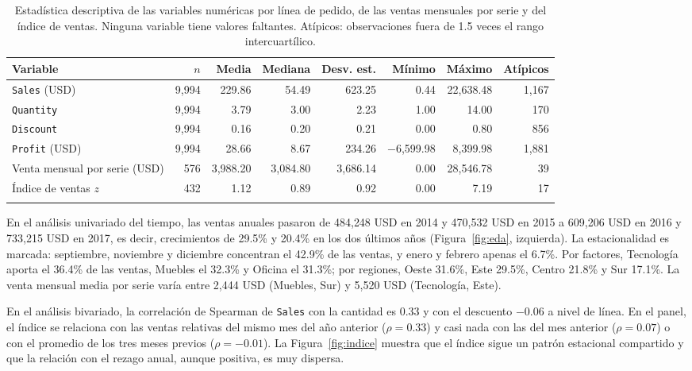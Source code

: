 \documentclass[pdflatex,sn-mathphys-num]{sn-jnl}
\theoremstyle{thmstyleone}
\begin{document}
\begin{table}[!htb]
\caption{Estadística descriptiva de las variables numéricas por línea de pedido, de las ventas mensuales por serie y del índice de ventas. Ninguna variable tiene valores faltantes. Atípicos: observaciones fuera de 1.5 veces el rango intercuartílico.}\label{tab:eda}
\footnotesize
\begin{tabular*}{\textwidth}{@{\extracolsep\fill}lrrrrrrr}
\toprule
Variable & $n$ & Media & Mediana & Desv. est. & Mínimo & Máximo & Atípicos \\
\midrule
\texttt{Sales} (USD) & 9{,}994 & 229.86 & 54.49 & 623.25 & 0.44 & 22{,}638.48 & 1{,}167 \\
\texttt{Quantity} & 9{,}994 & 3.79 & 3.00 & 2.23 & 1.00 & 14.00 & 170 \\
\texttt{Discount} & 9{,}994 & 0.16 & 0.20 & 0.21 & 0.00 & 0.80 & 856 \\
\texttt{Profit} (USD) & 9{,}994 & 28.66 & 8.67 & 234.26 & $-$6{,}599.98 & 8{,}399.98 & 1{,}881 \\
Venta mensual por serie (USD) & 576 & 3{,}988.20 & 3{,}084.80 & 3{,}686.14 & 0.00 & 28{,}546.78 & 39 \\
Índice de ventas $z$ & 432 & 1.12 & 0.89 & 0.92 & 0.00 & 7.19 & 17 \\
\botrule
\end{tabular*}
\end{table}

En el análisis univariado del tiempo, las ventas anuales pasaron de 484{,}248 USD en 2014 y 470{,}532 USD en 2015 a 609{,}206 USD en 2016 y 733{,}215 USD en 2017, es decir, crecimientos de 29.5\% y 20.4\% en los dos últimos años (Figura~\ref{fig:eda}, izquierda). La estacionalidad es marcada: septiembre, noviembre y diciembre concentran el 42.9\% de las ventas, y enero y febrero apenas el 6.7\%. Por factores, Tecnología aporta el 36.4\% de las ventas, Muebles el 32.3\% y Oficina el 31.3\%; por regiones, Oeste 31.6\%, Este 29.5\%, Centro 21.8\% y Sur 17.1\%. La venta mensual media por serie varía entre 2{,}444 USD (Muebles, Sur) y 5{,}520 USD (Tecnología, Este).

En el análisis bivariado, la correlación de Spearman de \texttt{Sales} con la cantidad es 0.33 y con el descuento $-0.06$ a nivel de línea. En el panel, el índice se relaciona con las ventas relativas del mismo mes del año anterior ($\rho=0.33$) y casi nada con las del mes anterior ($\rho=0.07$) o con el promedio de los tres meses previos ($\rho=-0.01$). La Figura~\ref{fig:indice} muestra que el índice sigue un patrón estacional compartido y que la relación con el rezago anual, aunque positiva, es muy dispersa.
\end{document}
